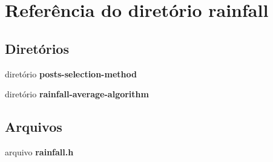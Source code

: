 \section{Referência do diretório rainfall}
\label{dir_381e94410e3db0e8c73f9b140c625bd6}
\subsection*{Diretórios}
\begin{DoxyCompactItemize}
\item 
diretório {\bf posts-\/selection-\/method}
\item 
diretório {\bf rainfall-\/average-\/algorithm}
\end{DoxyCompactItemize}
\subsection*{Arquivos}
\begin{DoxyCompactItemize}
\item 
arquivo {\bf rainfall.\+h}
\end{DoxyCompactItemize}
